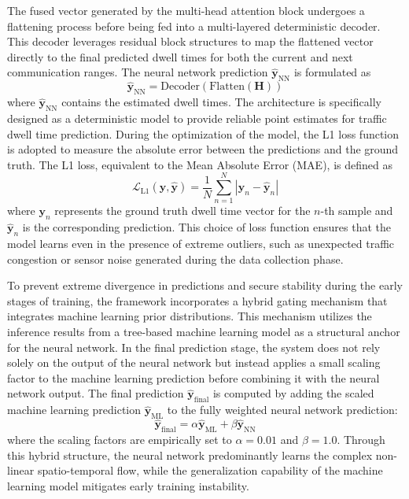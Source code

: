 \documentclass[journal]{IEEEtran}
\begin{document}
The fused vector generated by the multi-head attention block undergoes a flattening process before being fed into a multi-layered deterministic decoder. This decoder leverages residual block structures to map the flattened vector directly to the final predicted dwell times for both the current and next communication ranges. The neural network prediction $\hat{\mathbf{y}}_\text{NN}$ is formulated as
\begin{equation}
\hat{\mathbf{y}}_\text{NN} = \text{Decoder}(\text{Flatten}(\mathbf{H}))
\label{eq:decoder}
\end{equation}
where $\hat{\mathbf{y}}_\text{NN}$ contains the estimated dwell times. The architecture is specifically designed as a deterministic model to provide reliable point estimates for traffic dwell time prediction. During the optimization of the model, the L1 loss function is adopted to measure the absolute error between the predictions and the ground truth. The L1 loss, equivalent to the Mean Absolute Error (MAE), is defined as
\begin{equation}
\mathcal{L}_\text{L1}(\mathbf{y}, \hat{\mathbf{y}}) = \frac{1}{N} \sum_{n=1}^{N} |\mathbf{y}_n - \hat{\mathbf{y}}_n|
\label{eq:l1_loss}
\end{equation}
where $\mathbf{y}_n$ represents the ground truth dwell time vector for the $n$-th sample and $\hat{\mathbf{y}}_n$ is the corresponding prediction. This choice of loss function ensures that the model learns even in the presence of extreme outliers, such as unexpected traffic congestion or sensor noise generated during the data collection phase.

To prevent extreme divergence in predictions and secure stability during the early stages of training, the framework incorporates a hybrid gating mechanism that integrates machine learning prior distributions. This mechanism utilizes the inference results from a tree-based machine learning model as a structural anchor for the neural network. In the final prediction stage, the system does not rely solely on the output of the neural network but instead applies a small scaling factor to the machine learning prediction before combining it with the neural network output. The final prediction $\hat{\mathbf{y}}_\text{final}$ is computed by adding the scaled machine learning prediction $\hat{\mathbf{y}}_\text{ML}$ to the fully weighted neural network prediction:
\begin{equation}
\hat{\mathbf{y}}_\text{final} = \alpha \hat{\mathbf{y}}_\text{ML} + \beta \hat{\mathbf{y}}_\text{NN}
\label{eq:hybrid}
\end{equation}
where the scaling factors are empirically set to $\alpha = 0.01$ and $\beta = 1.0$. Through this hybrid structure, the neural network predominantly learns the complex non-linear spatio-temporal flow, while the generalization capability of the machine learning model mitigates early training instability.
\end{document}
